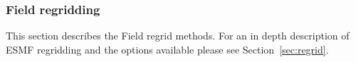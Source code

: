  
\setlength{\oldparskip}{\parskip}
\setlength{\parskip}{1.5ex}
\setlength{\oldparindent}{\parindent}
\setlength{\parindent}{0pt}
\setlength{\oldbaselineskip}{\baselineskip}
\setlength{\baselineskip}{11pt}
 
\def\bv{\begin{verbatim}}
\def\ev{\end{verbatim}}
\def\be{\begin{equation}}
\def\ee{\end{equation}}
\def\bea{\begin{eqnarray}}
\def\eea{\end{eqnarray}}
\def\bi{\begin{itemize}}
\def\ei{\end{itemize}}
\def\bn{\begin{enumerate}}
\def\en{\end{enumerate}}
\def\bd{\begin{description}}
\def\ed{\end{description}}
\def\({\left (}
\def\){\right )}
\def\[{\left [}
\def\]{\right ]}
\def\<{\left  \langle}
\def\>{\right \rangle}
\def\cI{{\cal I}}
\def\diag{\mathop{\rm diag}}
\def\tr{\mathop{\rm tr}}


 

  \subsubsection{Field regridding}\label{sec:fieldregrid}
  
   This section describes the Field regrid methods. For an in depth description of ESMF regridding and the options available
   please see Section~\ref{sec:regrid}. 
  
